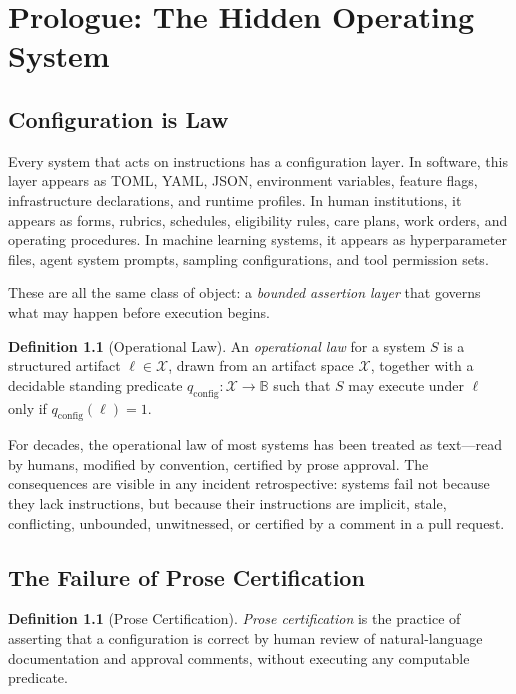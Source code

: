 \documentclass[12pt, letterpaper]{report}
\theoremstyle{plain}
\theoremstyle{definition}
\newtheorem{definition}[theorem]{Definition}
\theoremstyle{remark}
\newcommand{\BB}{\mathbb{B}}
\newcommand{\qc}{q_{\mathrm{config}}}
\begin{document}
\tableofcontents
\listoffigures
\listoftables
\newpage
{}

\chapter{Prologue: The Hidden Operating System}
\label{ch:prologue}

\section{Configuration is Law}

Every system that acts on instructions has a configuration layer.
In software, this layer appears as TOML, YAML, JSON, environment variables,
feature flags, infrastructure declarations, and runtime profiles.
In human institutions, it appears as forms, rubrics, schedules,
eligibility rules, care plans, work orders, and operating procedures.
In machine learning systems, it appears as hyperparameter files,
agent system prompts, sampling configurations, and tool permission sets.

These are all the same class of object: a \emph{bounded assertion layer}
that governs what may happen before execution begins.

\begin{definition}[Operational Law]
\label{def:operational-law}
An \emph{operational law} for a system $S$ is a structured artifact
$\ell \in \mathcal{X}$, drawn from an artifact space $\mathcal{X}$,
together with a decidable standing predicate $\qc : \mathcal{X} \to \BB$
such that $S$ may execute under $\ell$ only if $\qc(\ell) = 1$.
\end{definition}

For decades, the operational law of most systems has been treated as
text---read by humans, modified by convention, certified by prose approval.
The consequences are visible in any incident retrospective:
systems fail not because they lack instructions, but because their
instructions are implicit, stale, conflicting, unbounded, unwitnessed, or
certified by a comment in a pull request.

\section{The Failure of Prose Certification}

\begin{definition}[Prose Certification]
\emph{Prose certification} is the practice of asserting that a
configuration is correct by human review of natural-language documentation
and approval comments, without executing any computable predicate.
\end{definition}
\end{document}
